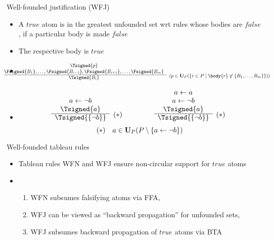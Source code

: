 \begin{frame}{Well-founded justification (WFJ)}
\begin{itemize}
\item {} A $\mathit{true}$ atom is in the greatest unfounded set wrt rules whose bodies are $\mathit{false}$,
  if a particular body is made $\mathit{false}$
\item {} The respective body is $\mathit{true}$
\item {} %
\[
\hspace{-10mm}
{\small
\begin{array}{@{}cl}
\Tsigned{p} \\
\Fsigned{B_1},\dots,\Fsigned{B_{i-1}},\Fsigned{B_{i+1}},\dots,\Fsigned{B_m} &
\raisebox{-8pt}[0pt][0pt]{($p \in \mathbf{U}_P(\{r \in P \mid \body{r} \not\in \{B_1,\dots,B_m\}\})$)}
\\\cline{1-1}
\Tsigned{B_i}
\end{array}
}
\]
\item<2->  %
\[
\begin{array}[b]{cl}
a \leftarrow \neg b \\
\Tsigned{a} &
\raisebox{-8pt}[0pt][0pt]{$(*)$}
\\\cline{1-1}
\Tsigned{\{\neg b\}}
\end{array}
\qquad\qquad
\begin{array}[b]{cl}
a \leftarrow a \\
a \leftarrow \neg b \\
\Tsigned{a} &
\raisebox{-8pt}[0pt][0pt]{$(*)$}
\\\cline{1-1}
\Tsigned{\{\neg b\}}
\end{array}
\hfill
\]
\[
\hfill
(*)\quad a \in \mathbf{U}_P(P \setminus \{a \leftarrow \neg b\})
\hfill\hfill
\]
\end{itemize}
\end{frame}
\begin{frame}{Well-founded tableau rules}
  \begin{itemize}
  \item<1-> Tableau rules WFN and WFJ ensure non-circular support for $\mathit{true}$ atoms
  \item <2-> 
    \begin{enumerate}
    \item WFN subsumes falsifying atoms via FFA,
    \item WFJ can be viewed as ``backward propagation'' for unfounded sets,
    \item WFJ subsumes backward propagation of $\mathit{true}$ atoms via BTA
    \end{enumerate}
  \end{itemize}
\end{frame}
